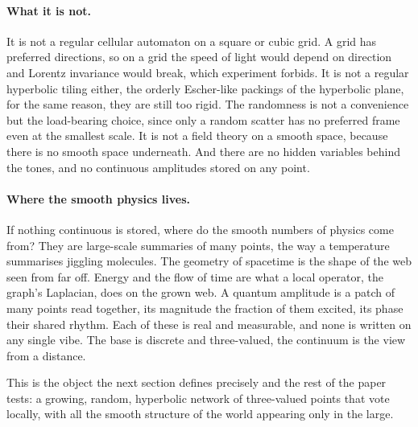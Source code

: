 \paragraph{What it is not.}
It is not a regular cellular automaton on a square or cubic grid. A grid has preferred
directions, so on a grid the speed of light would depend on direction and Lorentz
invariance would break, which experiment forbids. It is not a regular hyperbolic tiling
either, the orderly Escher-like packings of the hyperbolic plane, for the same reason,
they are still too rigid. The randomness is not a convenience but the load-bearing
choice, since only a random scatter has no preferred frame even at the smallest scale.
It is not a field theory on a smooth space, because there is no smooth space underneath.
And there are no hidden variables behind the tones, and no continuous amplitudes stored
on any point.

\paragraph{Where the smooth physics lives.}
If nothing continuous is stored, where do the smooth numbers of physics come from? They
are large-scale summaries of many points, the way a temperature summarises jiggling
molecules. The geometry of spacetime is the shape of the web seen from far off. Energy
and the flow of time are what a local operator, the graph's Laplacian, does on the grown
web. A quantum amplitude is a patch of many points read together, its magnitude the
fraction of them excited, its phase their shared rhythm. Each of these is real and
measurable, and none is written on any single vibe. The base is discrete and
three-valued, the continuum is the view from a distance.

This is the object the next section defines precisely and the rest of the paper tests: a
growing, random, hyperbolic network of three-valued points that vote locally, with all
the smooth structure of the world appearing only in the large.
